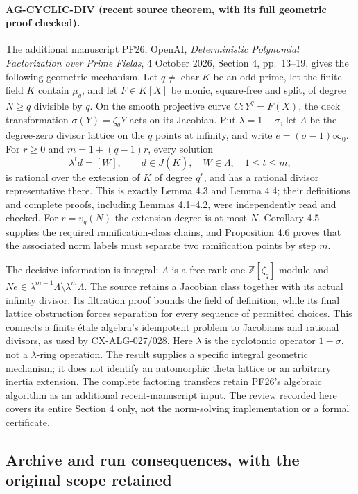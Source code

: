 \paragraph{AG-CYCLIC-DIV (recent source theorem, with its full geometric proof checked).}
The additional manuscript PF26, OpenAI,
\emph{Deterministic Polynomial Factorization over Prime Fields},
4 October 2026, Section 4, pp.~13--19, gives the following
geometric mechanism. Let $q\ne\operatorname{char}K$ be an odd
prime, let the finite field $K$ contain $\mu_q$, and let
$F\in K[X]$ be monic, square-free and split, of degree
$N\ge q$ divisible by $q$. On the smooth projective curve
$C:Y^q=F(X)$, the deck transformation $\sigma(Y)=\zeta_qY$
acts on its Jacobian. Put $\lambda=1-\sigma$, let $\Lambda$
be the degree-zero divisor lattice on the $q$ points at infinity,
and write $e=(\sigma-1)\infty_0$.
For $r\ge0$ and $m=1+(q-1)r$, every solution
\[
 \lambda^t d=[W],\qquad d\in J(\bar K),\quad
 W\in\Lambda,\quad 1\le t\le m,
\]
is rational over the extension of $K$ of degree $q^r$, and
has a rational divisor representative there. This is exactly
Lemma 4.3 and Lemma 4.4; their definitions and complete proofs,
including Lemmas 4.1--4.2, were independently read and checked.
For $r=v_q(N)$ the extension degree is at most $N$.
Corollary 4.5 supplies the required ramification-class chains,
and Proposition 4.6 proves that the associated norm labels
must separate two ramification points by step $m$.

The decisive information is integral: $\Lambda$ is a free
rank-one $\mathbb Z[\zeta_q]$ module and
$Ne\in\lambda^{m-1}\Lambda\setminus\lambda^m\Lambda$.
The source retains a Jacobian class together with its actual
infinity divisor. Its filtration proof bounds the field of
definition, while its final lattice obstruction forces
separation for every sequence of permitted choices. This
connects a finite \'etale algebra's idempotent problem to
Jacobians and rational divisors, as used by CX-ALG-027/028.
Here $\lambda$ is the cyclotomic operator $1-\sigma$, not
a $\lambda$-ring operation. The result supplies a specific
integral geometric mechanism; it does not identify an
automorphic theta lattice or an arbitrary inertia extension.
The complete factoring transfers retain PF26's algebraic
algorithm as an additional recent-manuscript input. The
review recorded here covers its entire Section 4 only, not
the norm-solving implementation or a formal certificate.

\subsection{Archive and run consequences, with the original scope retained}
\label{ag:archive}

